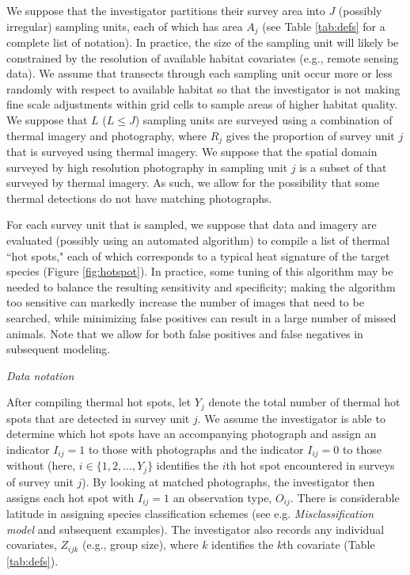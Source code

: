 \documentclass[12pt,fleqn]{article}
\begin{document}
\begin{flushleft}
We suppose that the investigator partitions their survey area into $J$ (possibly irregular) sampling units, each of which has area $A_j$ (see Table \ref{tab:defs} for a complete list of notation).  In practice, the size of the sampling unit will likely be constrained by the resolution of available habitat covariates (e.g., remote sensing data).  We assume that transects through each sampling unit occur more or less randomly with respect to available habitat so that the investigator is not making fine scale adjustments within grid cells to sample areas of higher habitat quality.
We suppose that $L$ ($L \le J$) sampling units are surveyed using a combination of thermal imagery and photography, where $R_j$ gives the proportion of survey unit $j$ that is surveyed using thermal imagery.  We suppose that the spatial domain surveyed by high resolution photography in sampling unit $j$ is a subset of that surveyed by thermal imagery.  As such, we allow for the possibility that some thermal detections do not
have matching photographs.

\hspace{.5in}For each survey unit that is sampled, we suppose that data and imagery are evaluated (possibly using an automated algorithm) to compile a list of thermal ``hot spots," each of which corresponds to a typical heat signature of the target species (Figure \ref{fig:hotspot}).  In practice, some tuning of this algorithm may be needed to balance the resulting sensitivity and specificity; making the algorithm too sensitive can markedly increase the number of images that need to be searched, while minimizing false positives can result in a large number of missed animals.  Note that we allow for both false positives and false negatives in subsequent modeling.


\vspace{.15in}
{\it Data notation} \\
\vspace{.15in}

\hspace{.5in}After compiling thermal hot spots, let $Y_j$ denote the total number of thermal hot spots that are
detected in survey unit $j$.  We assume the investigator is able to determine which hot spots
have an accompanying photograph and assign an indicator $I_{ij}=1$ to those with photographs and the indicator $I_{ij}=0$ to those without (here, $i \in \{ 1,2,\hdots,Y_j \}$ identifies the $i$th hot spot encountered in surveys of survey unit $j$).   By looking at matched photographs, the investigator then assigns each hot spot with $I_{ij}=1$ an observation type, $O_{ij}$.  There is considerable latitude in assigning species classification schemes (see e.g. {\it Misclassification model} and subsequent examples).  The investigator also records any individual covariates, $Z_{ijk}$ (e.g., group size), where $k$
identifies the $k$th covariate (Table \ref{tab:defs}).



\end{flushleft}
\end{document}

